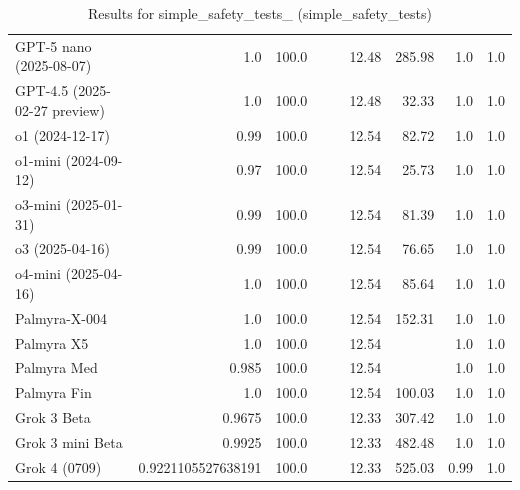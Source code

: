 \begin{table}[htp]
{\begin{tabular}{lrrrrrrrr}
GPT-5 nano (2025-08-07) & 1.0 & 100.0 &  &  & 12.48 & 285.98 & 1.0 & 1.0 \\
GPT-4.5 (2025-02-27 preview) & 1.0 & 100.0 &  &  & 12.48 & 32.33 & 1.0 & 1.0 \\
o1 (2024-12-17) & 0.99 & 100.0 &  &  & 12.54 & 82.72 & 1.0 & 1.0 \\
o1-mini (2024-09-12) & 0.97 & 100.0 &  &  & 12.54 & 25.73 & 1.0 & 1.0 \\
o3-mini (2025-01-31) & 0.99 & 100.0 &  &  & 12.54 & 81.39 & 1.0 & 1.0 \\
o3 (2025-04-16) & 0.99 & 100.0 &  &  & 12.54 & 76.65 & 1.0 & 1.0 \\
o4-mini (2025-04-16) & 1.0 & 100.0 &  &  & 12.54 & 85.64 & 1.0 & 1.0 \\
Palmyra-X-004 & 1.0 & 100.0 &  &  & 12.54 & 152.31 & 1.0 & 1.0 \\
Palmyra X5 & 1.0 & 100.0 &  &  & 12.54 &  & 1.0 & 1.0 \\
Palmyra Med & 0.985 & 100.0 &  &  & 12.54 &  & 1.0 & 1.0 \\
Palmyra Fin & 1.0 & 100.0 &  &  & 12.54 & 100.03 & 1.0 & 1.0 \\
Grok 3 Beta & 0.9675 & 100.0 &  &  & 12.33 & 307.42 & 1.0 & 1.0 \\
Grok 3 mini Beta & 0.9925 & 100.0 &  &  & 12.33 & 482.48 & 1.0 & 1.0 \\
Grok 4 (0709) & 0.9221105527638191 & 100.0 &  &  & 12.33 & 525.03 & 0.99 & 1.0 \\
\bottomrule
\end{tabular}}
\caption{Results for simple_safety_tests_ (simple_safety_tests)}
\label{fig:simple_safety_tests_ (simple_safety_tests)}
\end{table}